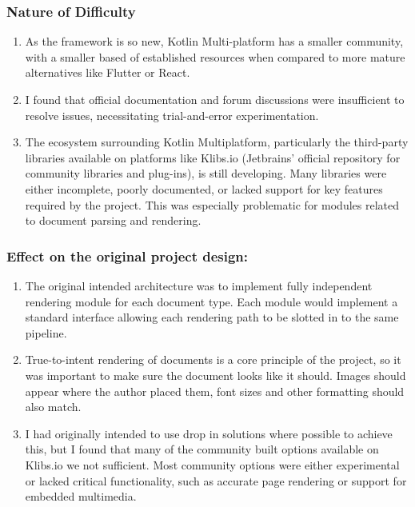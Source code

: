         \subsubsection{Nature of Difficulty}
            \begin{enumerate}
                \item
                As the framework is so new, Kotlin Multi-platform has a smaller community, with a smaller based of established resources when compared to more mature alternatives like Flutter or React. 
                \item
                I found that official documentation and forum discussions were insufficient to resolve issues, necessitating trial-and-error experimentation.
                \item
                The ecosystem surrounding Kotlin Multiplatform, particularly the third-party libraries available on platforms like Klibs.io (Jetbrains' official repository for community libraries and plug-ins), is still developing. Many libraries were either incomplete, poorly documented, or lacked support for key features required by the project. This was especially problematic for modules related to document parsing and rendering.
          \end{enumerate}  
    
            
        \subsubsection{Effect on the original project design:}
            \begin{enumerate}
                \item The original intended architecture was to implement fully independent rendering module for each document type. Each module would implement a standard interface allowing each rendering path to be slotted in to the same pipeline.
                \item
                True-to-intent rendering of documents is a core principle of the project, so it was important to make sure the document looks like it should. Images should appear where the author placed them, font sizes and other formatting should also match. 
                \item
                I had originally intended to use drop in solutions where possible to achieve this, but I found that many of the community built options available on Klibs.io we not sufficient. Most community options were either experimental or lacked critical functionality, such as accurate page rendering or support for embedded multimedia.

            \end{enumerate}
    
